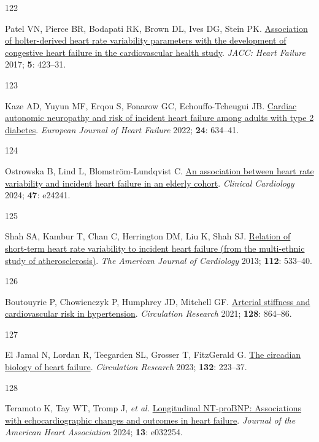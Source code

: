 \documentclass[
  a4paper,
  headsepline=true,
  open=left]{scrbook}
\newlength{\cslhangindent}
\newlength{\csllabelwidth}
\newlength{\cslentryspacingunit} %
\newenvironment{CSLReferences}[2] %
 {%
  \setlength{\parindent}{0pt}
  \ifodd #1
  \let\oldpar\par
  \def\par{\hangindent=\cslhangindent\oldpar}
  \fi
  \setlength{\parskip}{#2\cslentryspacingunit}
 }%
 {}
\newcommand{\CSLLeftMargin}[1]{\parbox[t]{\csllabelwidth}{#1}}
\newcommand{\CSLRightInline}[1]{\parbox[t]{\linewidth - \csllabelwidth}{#1}\break}
\begin{document}
\begin{CSLReferences}{0}{0}
\leavevmode{}%
\CSLLeftMargin{122 }%
\CSLRightInline{Patel VN, Pierce BR, Bodapati RK, Brown DL, Ives DG,
Stein PK. \href{https://doi.org/10.1016/j.jchf.2016.12.015}{Association
of holter-derived heart rate variability parameters with the development
of congestive heart failure in the cardiovascular health study}.
\emph{JACC: Heart Failure} 2017; \textbf{5}: 423--31.}

\leavevmode{}%
\CSLLeftMargin{123 }%
\CSLRightInline{Kaze AD, Yuyun MF, Erqou S, Fonarow GC,
Echouffo-Tcheugui JB. \href{https://doi.org/10.1002/ejhf.2432}{Cardiac
autonomic neuropathy and risk of incident heart failure among adults
with type 2 diabetes}. \emph{European Journal of Heart Failure} 2022;
\textbf{24}: 634--41.}

\leavevmode{}%
\CSLLeftMargin{124 }%
\CSLRightInline{Ostrowska B, Lind L, Blomström-Lundqvist C.
\href{https://doi.org/10.1002/clc.24241}{An association between heart
rate variability and incident heart failure in an elderly cohort}.
\emph{Clinical Cardiology} 2024; \textbf{47}: e24241.}

\leavevmode{}%
\CSLLeftMargin{125 }%
\CSLRightInline{Shah SA, Kambur T, Chan C, Herrington DM, Liu K, Shah
SJ. \href{https://doi.org/10.1016/j.amjcard.2013.04.018}{Relation of
short-term heart rate variability to incident heart failure (from the
multi-ethnic study of atherosclerosis)}. \emph{The American Journal of
Cardiology} 2013; \textbf{112}: 533--40.}

\leavevmode{}%
\CSLLeftMargin{126 }%
\CSLRightInline{Boutouyrie P, Chowienczyk P, Humphrey JD, Mitchell GF.
\href{https://doi.org/10.1161/CIRCRESAHA.121.318061}{Arterial stiffness
and cardiovascular risk in hypertension}. \emph{Circulation Research}
2021; \textbf{128}: 864--86.}

\leavevmode{}%
\CSLLeftMargin{127 }%
\CSLRightInline{El Jamal N, Lordan R, Teegarden SL, Grosser T,
FitzGerald G. \href{https://doi.org/10.1161/CIRCRESAHA.122.321369}{The
circadian biology of heart failure}. \emph{Circulation Research} 2023;
\textbf{132}: 223--37.}

\leavevmode{}%
\CSLLeftMargin{128 }%
\CSLRightInline{Teramoto K, Tay WT, Tromp J, \emph{et al.}
\href{https://doi.org/10.1161/JAHA.123.032254}{Longitudinal NT{-}proBNP:
Associations with echocardiographic changes and outcomes in heart
failure}. \emph{Journal of the American Heart Association} 2024;
\textbf{13}: e032254.}


\end{CSLReferences}
\end{document}
